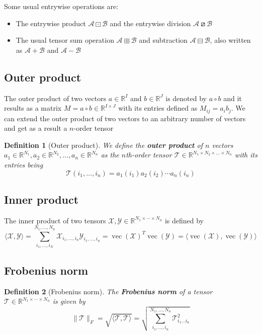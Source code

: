 \documentclass[11pt,a4paper,openright,oneside]{book}
\numberwithin{equation}{section}
\newtheorem{defn0}{Definition}[chapter]
\newenvironment{definition}{ \begin{defn0}}{\end{defn0}}
\DeclareMathOperator{\vectorize}{vec}
\begin{document}
Some usual entrywise operations are:
\begin{itemize}
    \item The entrywise product $\mathcal{A} \boxdot \mathcal{B}$ and the entrywise division $\mathcal{A} \boxslash \mathcal{B}$
    \item The usual tensor sum operation $\mathcal{A} \boxplus \mathcal{B}$ and subtraction $\mathcal{A} \boxminus \mathcal{B}$, also written as $\mathcal{A} + \mathcal{B}$ and $\mathcal{A} - \mathcal{B}$
\end{itemize}

\subsection*{Outer product}
The outer product of two vectors $a \in \mathbb{R}^I$ and $b \in \mathbb{R}^J$ is denoted by $a \circ b$ and it results
as a matrix $M = a \circ b \in \mathbb{R}^{I \times J}$ with its entries defined as $M_{ij} = a_i b_j$. We can extend the outer
product of two vectors to an arbitrary number of vectors and get as a result a $n$-order tensor

\begin{definition}[Outer product]
    We define the \textbf{outer product} of $n$ vectors 
    $a_1 \in \mathbb{R}^{N_1}, a_2 \in \mathbb{R}^{N_2}, \dots, a_n \in \mathbb{R}^{N_n}$
    as the $n$th-order tensor $\mathcal{T} \in \mathbb{R}^{N_1 \times N_2 \times \dots \times N_n}$ with its entries being
    $$\mathcal{T}(i_1, \dots, i_n) = a_1(i_1) a_2(i_2) \cdots a_n(i_n)$$
\end{definition}
\subsection*{Inner product}
The inner product of two tensors $\mathcal{X}, \mathcal{Y} \in \mathbb{R}^{N_1 \times \cdots \times N_n}$ is defined by
$$\langle \mathcal{X},\mathcal{Y} \rangle = \sum_{i_1, \dots, i_N}^{N_1, \dots, N_n} \mathcal{X}_{i_1, \dots, i_n} \mathcal{Y}_{i_1, \dots, i_n} = 
\vectorize(\mathcal{X})^T \vectorize(\mathcal{Y}) = \langle \vectorize(\mathcal{X}), \vectorize(\mathcal{Y}) \rangle$$

\subsection*{Frobenius norm}
\begin{definition}[Frobenius norm]
The \textbf{Frobenius norm} of a tensor $\mathcal{T} \in \mathbb{R}^{N_1 \times \cdots \times N_n}$ is given by
$$\|\mathcal{T}\|_F = \sqrt{\langle \mathcal{T}, \mathcal{T} \rangle} = \sqrt{\sum_{i_1, \dots, i_n}^{N_1, \dots, N_n}
\mathcal{T}_{i_1 \dots i_n}^2}$$
\end{definition}
\end{document}
